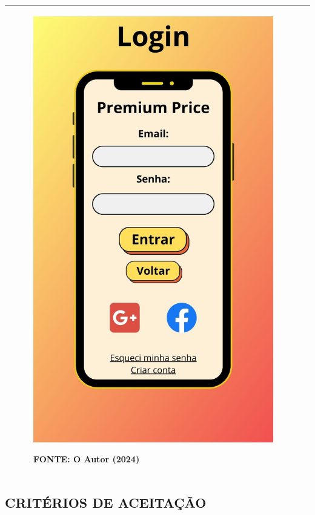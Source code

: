 \begin{tabular}{|ll|}
\begin{minipage}{0.48\textwidth}
\begin{figure}[H]
\includegraphics[width=\textwidth]{fig/telas/t_login.jpg}
\footnotesize \centering
\par FONTE: O Autor (2024)
\end{figure}
\end{minipage}
 \\ \hline
\end{tabular}

\subsection*{\textbf{CRITÉRIOS DE ACEITAÇÃO}}

